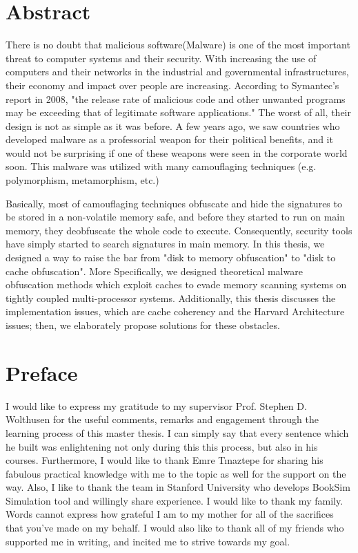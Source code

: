 \documentclass[medieteknikk]{gucmasterthesis}
\begin{document}
	\thesisdate{\gucmasterthesisdate}
\makefrontpages %
\thesistitlepage %


\chapter*{Abstract}

There is no doubt that malicious software(Malware) is one of the most important threat to computer systems and their security. With increasing the use of computers and their networks in the industrial and governmental infrastructures, their economy and impact over people are increasing. According to Symantec's report in 2008\cite{turner2008symantec}, "the release rate of malicious code and other unwanted programs may be exceeding that of legitimate software applications." The worst of all, their design is not as simple as it was before. A few years ago, we saw countries who developed malware as a professorial weapon for their political benefits, and it would not be surprising if one of these weapons were seen in the corporate world soon. This malware was utilized with many camouflaging techniques (e.g. polymorphism, metamorphism, etc.)

Basically, most of camouflaging techniques obfuscate and hide the signatures to be stored in a non-volatile memory safe, and before they started to run on main memory, they deobfuscate the whole code to execute.  Consequently, security tools have simply started to search signatures in main memory. In this thesis, we designed a way to raise the bar from "disk to memory obfuscation" to "disk to cache obfuscation". More Specifically, we designed theoretical malware obfuscation methods which exploit caches to evade memory scanning systems on tightly coupled multi-processor systems. Additionally, this thesis discusses the implementation issues, which are cache coherency and the Harvard Architecture issues; then, we elaborately propose solutions for these obstacles.
\chapter*{Preface}

I would like to express my gratitude to my supervisor Prof. Stephen D. Wolthusen for the useful comments, remarks and engagement through the learning process of this master thesis. I can simply say that every sentence which he built was enlightening not only during this this process, but also in his courses. Furthermore, I would like to thank Emre Tınaztepe for sharing his fabulous practical knowledge with me to the topic as well for the support on the way. Also, I like to thank the team in Stanford University who develops BookSim Simulation tool and willingly share experience. I would like to thank my family.  Words cannot express how grateful I am to my mother for all of the sacrifices that you've made on my behalf. I would also like to thank all of my friends who supported me in writing, and incited me to strive towards my goal.
\end{document}
